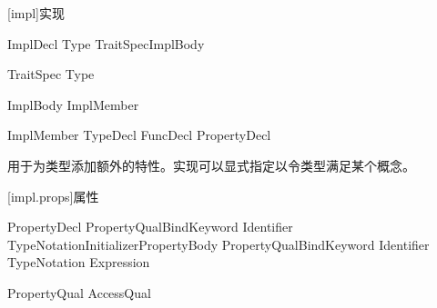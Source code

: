 
[impl]{实现}

\begin{bnf}{ImplDecl}
     Type TraitSpec\bnfq ImplBody
\end{bnf}

\begin{bnf}{TraitSpec}
    \terminal{:} Type
\end{bnf}

\begin{bnf}{ImplBody}
    \terminal{\{} ImplMember\bnfs \terminal{\}} \br
    \terminal{;}
    \terminal{=}  \terminal{;}
\end{bnf}

\begin{bnf}{ImplMember}
    TypeDecl \br
    FuncDecl \br
    PropertyDecl
\end{bnf}

\pnum
{}用于为类型添加额外的特性。实现可以显式指定以令类型满足某个概念。






[impl.props]{属性}

\begin{bnf}{PropertyDecl}
    PropertyQual\bnfs BindKeyword Identifier TypeNotation\bnfq Initializer\bnfq PropertyBody \terminal{;} \br
    PropertyQual\bnfs BindKeyword Identifier TypeNotation\bnfq \terminal{=>} Expression \terminal{;}
\end{bnf}

\begin{bnf}{PropertyQual}
    AccessQual
\end{bnf}

